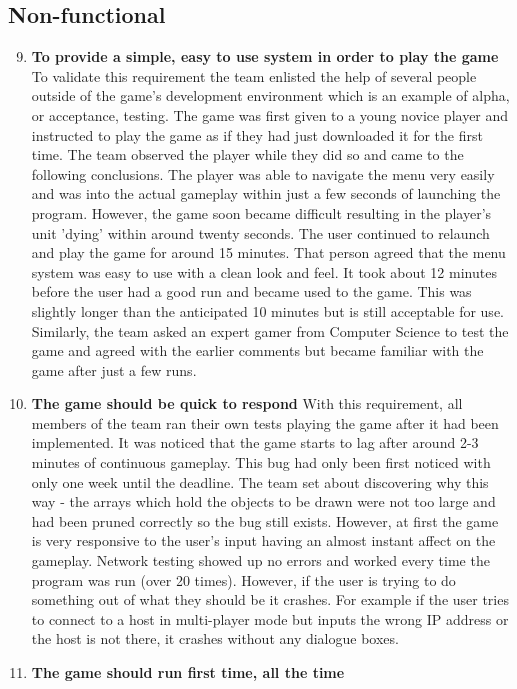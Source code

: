 \subsection{Non-functional}
\begin{enumerate}
\setcounter{enumi}{8}
\item \textbf{To provide a simple, easy to use system in order to play the game}
To validate this requirement the team enlisted the help of several people outside of the game's development environment which is an example of alpha, or acceptance, testing. The game was first given to a young novice player and instructed to play the game as if they had just downloaded it for the first time. The team observed the player while they did so and came to the following conclusions. The player was able to navigate the menu very easily and was into the actual gameplay within just a few seconds of launching the program. However, the game soon became difficult resulting in the player's unit 'dying' within around twenty seconds. The user continued to relaunch and play the game for around 15 minutes. That person agreed that the menu system was easy to use with a clean look and feel. It took about 12 minutes before the user had a good run and became used to the game. This was slightly longer than the anticipated 10 minutes but is still acceptable for use.\\ Similarly, the team asked an expert gamer from Computer Science to test the game and agreed with the earlier comments but became familiar with the game after just a few runs.
\item \textbf{The game should be quick to respond}
With this requirement, all members of the team ran their own tests playing the game after it had been implemented. It was noticed that the game starts to lag after around 2-3 minutes of continuous gameplay. This bug had only been first noticed with only one week until the deadline. The team set about discovering why this way - the arrays which hold the objects to be drawn were not too large and had been pruned correctly so the bug still exists. However, at first the game is very responsive to the user's input having an almost instant affect on the gameplay. Network testing showed up no errors and worked every time the program was run (over 20 times). However, if the user is trying to do something out of what they should be it crashes. For example if the user tries to connect to a host in multi-player mode but inputs the wrong IP address or the host is not there, it crashes without any dialogue boxes.
\item \textbf{The game should run first time, all the time}

\end{enumerate}
